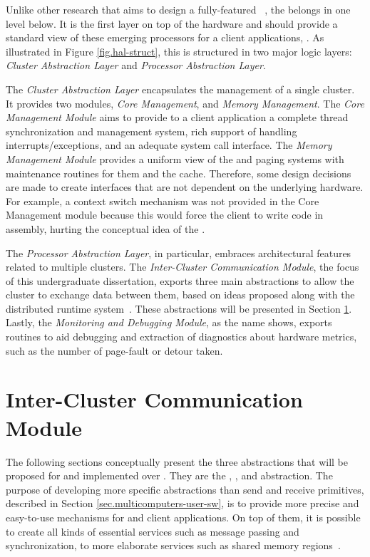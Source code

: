 	Unlike other research that aims to design a fully-featured \os~\cite{Baumann2009,kluge2014,nightingale2009,rhoden2011},
	the \hal belongs in one level below.
	It is the first layer on top of the hardware and should provide a standard
	view of these emerging processors for a client applications, \eg \os.
	As illustrated in Figure \ref{fig.hal-struct}, this \hal is structured in
	two major logic layers: \textit{Cluster Abstraction Layer} and \textit{Processor Abstraction Layer}.

	The \textit{Cluster Abstraction Layer} encapsulates the management of a single cluster.
	It provides two modules, \textit{Core Management}, and \textit{Memory Management}.
	The \textit{Core Management Module} aims to provide to a client application a complete
	thread synchronization and management system, rich support of handling
	interrupts/exceptions, and an adequate system call interface.
	The \textit{Memory Management Module} provides a uniform view of the \tlbs
	and paging systems with maintenance routines for them and the cache.
	Therefore, some design decisions are made to create interfaces that are not
	dependent on the underlying hardware.
	For example, a context switch mechanism was not provided in the
	Core Management module because this would force the client \os
	to write code in assembly, hurting the conceptual idea of the \hal.

	The \textit{Processor Abstraction Layer}, in particular, embraces
	architectural features related to multiple clusters.
	The \textit{Inter-Cluster Communication Module}, the focus of
	this undergraduate dissertation, exports three main abstractions to allow the
	cluster to exchange data between them, based on ideas proposed along with the
	\nodeos distributed runtime system~\cite{DeDinechin2013-1}.
	These abstractions will be presented in Section \ref{sec.inter-cluster-communication}.
	Lastly, the \textit{Monitoring and Debugging Module}, as the
	name shows, exports routines to aid debugging and extraction
	of diagnostics about hardware metrics, such as the number of
	page-fault or detour taken.

\section{Inter-Cluster Communication Module}
\label{sec.inter-cluster-communication}

	The following sections conceptually present the three abstractions
	that will be proposed for \hal and implemented over \mppa.
	They are the \sync, \mailbox, and \portal abstraction.
	The purpose of developing more specific abstractions than
	send and receive primitives, described in Section \ref{sec.multicomputers-user-sw},
	is to provide more precise and easy-to-use mechanisms for
	\os and client applications.
	On top of them, it is possible to create all kinds of essential
	services such as message passing and synchronization,
	to more elaborate services such as shared memory regions~\cite{penna:rmen}.

